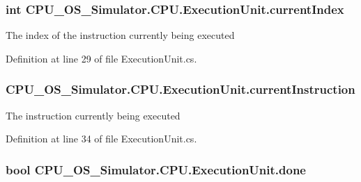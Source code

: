 \subsubsection[{current\+Index}]{\setlength{\rightskip}{0pt plus 5cm}int C\+P\+U\+\_\+\+O\+S\+\_\+\+Simulator.\+C\+P\+U.\+Execution\+Unit.\+current\+Index\hspace{0.3cm}{\ttfamily [private]}}\label{class_c_p_u___o_s___simulator_1_1_c_p_u_1_1_execution_unit_af6807cb5343acc2c40a08166c748f1f0}


The index of the instruction currently being executed 



Definition at line 29 of file Execution\+Unit.\+cs.

\hypertarget{class_c_p_u___o_s___simulator_1_1_c_p_u_1_1_execution_unit_a12fc8d1fd19eab177941b9f98675eb7f}{}
\subsubsection[{current\+Instruction}]{ C\+P\+U\+\_\+\+O\+S\+\_\+\+Simulator.\+C\+P\+U.\+Execution\+Unit.\+current\+Instruction\hspace{0.3cm}{\ttfamily [private]}}\label{class_c_p_u___o_s___simulator_1_1_c_p_u_1_1_execution_unit_a12fc8d1fd19eab177941b9f98675eb7f}


The instruction currently being executed 



Definition at line 34 of file Execution\+Unit.\+cs.

\hypertarget{class_c_p_u___o_s___simulator_1_1_c_p_u_1_1_execution_unit_aa62cb66691fd4d782a4fa5c70843da6e}{}
\subsubsection[{done}]{\setlength{\rightskip}{0pt plus 5cm}bool C\+P\+U\+\_\+\+O\+S\+\_\+\+Simulator.\+C\+P\+U.\+Execution\+Unit.\+done\hspace{0.3cm}{\ttfamily [private]}}\label{class_c_p_u___o_s___simulator_1_1_c_p_u_1_1_execution_unit_aa62cb66691fd4d782a4fa5c70843da6e}


